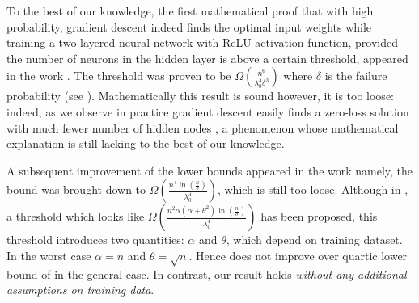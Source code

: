 \documentclass[a4paper,11pt]{amsart}
\theoremstyle{definition}
\theoremstyle{plain}
\theoremstyle{remark}
\begin{document}
To the best of our knowledge, the first mathematical proof that with high probability, gradient descent indeed finds the optimal input weights while training a two-layered neural network with ReLU activation function, provided the number of neurons in the hidden layer is above a certain threshold, appeared in the work \cite{gdescentOverPara1}. 
The threshold was proven to be $\Omega\left(\frac{n^6}{\lambda_0^4\delta^3}\right)$ where $\delta$ is the failure probability (see \cite[Theorem 3.2]{gdescentOverPara1}). 
Mathematically this result is sound however, it is too loose: indeed, as we observe in practice gradient descent easily finds a zero-loss solution with much fewer number of hidden nodes \cite[Section 6]{DLM}, a phenomenon whose mathematical explanation is still lacking to the best of our knowledge.

A subsequent improvement of the lower bounds appeared in the work \cite[Theorem 1.4]{gdescentOverPara2} namely, the bound was brought down to $\Omega\left(\frac{n^4\ln(\frac{n}{\delta})}{\lambda_0^4}\right)$, which is still too loose.
Although in \cite[Theorem 1.6]{gdescentOverPara2}, a threshold which looks like $\Omega\left(\frac{n^2\alpha(\alpha+\theta^2)\ln(\frac{n}{\delta})}{\lambda_0^4}\right)$ has been proposed, this threshold introduces two quantities: $\alpha$ and $\theta$, which depend on training dataset.
In the worst case $\alpha = n$ and $\theta = \sqrt{n}$.
Hence \cite[Theorem 1.6]{gdescentOverPara2} does not improve over quartic lower bound of \cite[Theorem 1.4]{gdescentOverPara2} in the general case.
In contrast, our result holds {\it without any additional assumptions on training data}.
\end{document}
